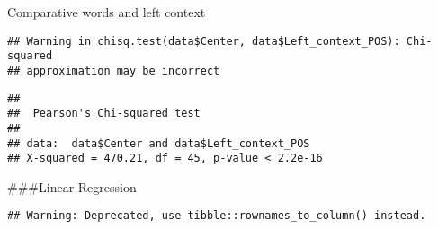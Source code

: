 \documentclass[
]{article}
\newenvironment{Shaded}{\begin{snugshade}}{\end{snugshade}}
\newcommand{\KeywordTok}[1]{\textcolor[rgb]{0.13,0.29,0.53}{\textbf{#1}}}
\newcommand{\NormalTok}[1]{#1}
\newcommand{\OperatorTok}[1]{\textcolor[rgb]{0.81,0.36,0.00}{\textbf{#1}}}
\newcommand{\StringTok}[1]{\textcolor[rgb]{0.31,0.60,0.02}{#1}}
\begin{document}
Comparative words and left context

\begin{Shaded}
\end{Shaded}

\begin{verbatim}
## Warning in chisq.test(data$Center, data$Left_context_POS): Chi-squared
## approximation may be incorrect
\end{verbatim}

\begin{verbatim}
## 
##  Pearson's Chi-squared test
## 
## data:  data$Center and data$Left_context_POS
## X-squared = 470.21, df = 45, p-value < 2.2e-16
\end{verbatim}

\#\#\#Linear Regression

\begin{Shaded}
\end{Shaded}

\begin{verbatim}
## Warning: Deprecated, use tibble::rownames_to_column() instead.
\end{verbatim}

\begin{Shaded}
\end{Shaded}
\end{document}
